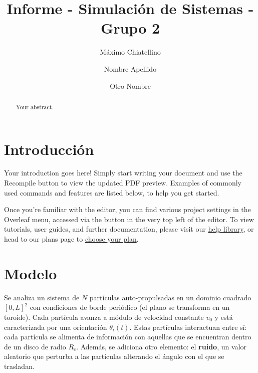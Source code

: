 \documentclass{article}
\title{Informe - Simulación de Sistemas - Grupo 2}
\author{
  Máximo Chiatellino \and
  Nombre Apellido \and
  Otro Nombre
}
\begin{document}
\maketitle

\begin{abstract}
Your abstract.
\end{abstract}

\section{Introducción}

Your introduction goes here! Simply start writing your document and use the Recompile button to view the updated PDF preview. Examples of commonly used commands and features are listed below, to help you get started.

Once you're familiar with the editor, you can find various project settings in the Overleaf menu, accessed via the button in the very top left of the editor. To view tutorials, user guides, and further documentation, please visit our \href{https://www.overleaf.com/learn}{help library}, or head to our plans page to \href{https://www.overleaf.com/user/subscription/plans}{choose your plan}.

\section{Modelo}

Se analiza un sistema de \(N\) partículas auto-propulsadas en un dominio cuadrado \([0,L]^2\) con condiciones de borde periódico (el plano se transforma en un toroide). Cada partícula avanza a módulo de velocidad constante \(v_0\) y está caracterizada por una orientación \(\theta_i(t)\). Estas partículas interactuan entre sí: cada partícula se alimenta de información con aquellas que se encuentran dentro de un disco de radio \(R_c\). Además, se adiciona otro elemento: el \textbf{ruido}, un valor aleatorio que perturba a las partículas alterando el ángulo con el que se trasladan.
\end{document}
